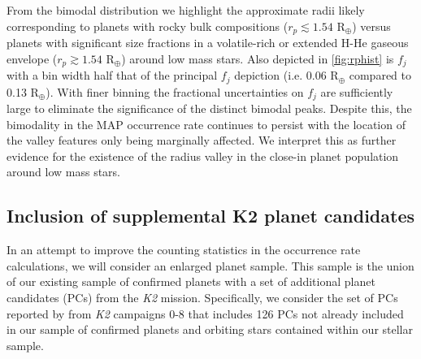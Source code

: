 \documentclass[twocolumn]{emulateapj}
\newcommand{\ktwo}[1]{\emph{K2}#1}
\begin{document}
From the bimodal distribution we highlight the approximate radii likely corresponding to planets with rocky
bulk compositions ($r_p\lesssim 1.54$ R$_{\oplus}$) versus planets with significant size fractions in a volatile-rich
or extended H-He gaseous
envelope ($r_p\gtrsim 1.54$ R$_{\oplus}$) around
low mass stars. Also depicted in \autoref{fig:rphist} is $f_j$ with a bin width half that of the principal
$f_j$ depiction (i.e. 0.06 R$_{\oplus}$ compared to 0.13 R$_{\oplus}$).
With finer binning the fractional uncertainties on $f_j$ are sufficiently
large to eliminate the significance of the distinct bimodal peaks. Despite this, the bimodality in the MAP
occurrence rate continues to persist with the location of the valley features only being marginally affected.
We interpret this as further evidence for the existence of the radius valley in the close-in planet population
around low mass stars.

\vspace{1cm}

\subsection{Inclusion of supplemental K2 planet candidates}
In an attempt to improve the counting statistics in the occurrence rate calculations,
we will consider an enlarged planet sample. This sample is the union of our existing sample of confirmed planets
with a set of additional planet candidates (PCs) from the \ktwo{}
mission. Specifically, we consider the set of PCs reported by \cite{kruse19}
from \ktwo{} campaigns 0-8 that includes 126 PCs not already included in our sample of confirmed planets
and orbiting stars contained within our stellar sample.
\end{document}
